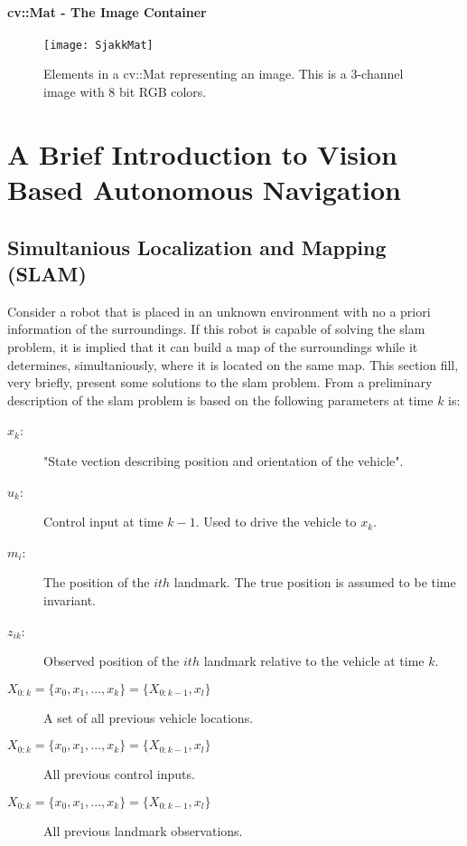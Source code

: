 \paragraph{cv::Mat - The Image Container}

\begin{figure}
\centering
\texttt{[image: SjakkMat]}
\caption{Elements in a cv::Mat representing an image. This is a 3-channel image with 8 bit RGB colors.}
\label{fig:matGrid}
\end{figure}

\section{A Brief Introduction to Vision Based Autonomous Navigation}

\subsection{Simultanious Localization and Mapping (SLAM)}

Consider a robot that is placed in an unknown environment with no a priori information of the surroundings. If this robot is capable of solving the \gls{slam} problem, it is implied that it can build a map of the surroundings while it determines, simultaniously, where it is located on the same map. This section fill, very briefly, present some solutions to the \gls{slam} problem. From \cite{SLAMp1} a preliminary description of the \gls{slam} problem is based on the following parameters at time $k$ is:
\vspace{-10pt} %
\begin{description}
	\item[\boldmath$x_k$:] "State vection describing position and orientation of the vehicle"\cite{SLAMp1}.
	\item[\boldmath$u_k$:] Control input at time $k - 1$. Used to drive the vehicle to $x_k$. 
	\item[\boldmath$m_i$:] The position of the $ith$ landmark. The true position is assumed to be time invariant.
	\item[\boldmath$z_{ik}$:] Observed position of the $ith$ landmark relative to the vehicle at time $k$.
	\item[\boldmath$X_{0:k} = \{ x_0, x_1, ... , x_k\} = \{ X_{0:k-1}, x_l \}$] A set of all previous vehicle locations. 
	\item[\boldmath$X_{0:k} = \{ x_0, x_1, ... , x_k\} = \{ X_{0:k-1}, x_l \}$] All previous control inputs.
	\item[\boldmath$X_{0:k} = \{ x_0, x_1, ... , x_k\} = \{ X_{0:k-1}, x_l \}$] All previous landmark observations.
\end{description}

